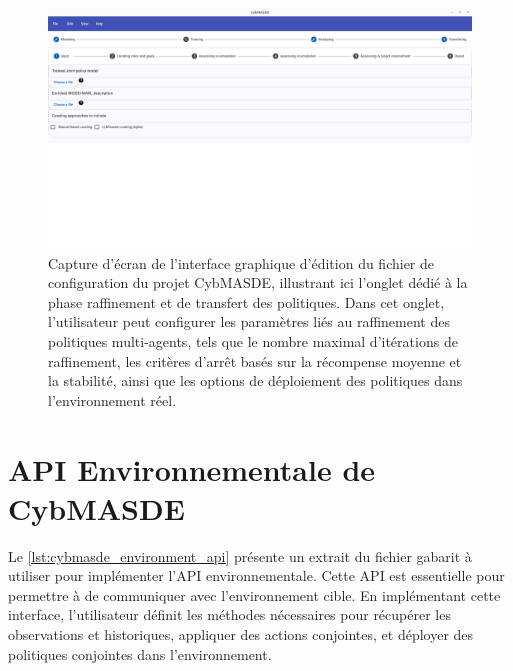 \begin{figure}[h!]
       \centering
       \includegraphics[trim=0cm 15cm 0cm 0cm, clip,width=\linewidth]{figures/refining.png}
       \caption[Capture d'écran de l'onglet raffinement et transfert de l'interface graphique de CybMASDE]{Capture d'écran de l'interface graphique d'édition du fichier de configuration du projet CybMASDE, illustrant ici l'onglet dédié à la phase raffinement et de transfert des politiques. Dans cet onglet, l'utilisateur peut configurer les paramètres liés au raffinement des politiques multi-agents, tels que le nombre maximal d'itérations de raffinement, les critères d'arrêt basés sur la récompense moyenne et la stabilité, ainsi que les options de déploiement des politiques dans l'environnement réel.}
       \label{fig:cybmasde_refining_screenshot}
\end{figure}

\clearpage

\section{API Environnementale de CybMASDE}\label{appendix:cybmasde-environment-api}

Le \autoref{lst:cybmasde_environment_api} présente un extrait du fichier gabarit à utiliser pour implémenter l'API environnementale. Cette API est essentielle pour permettre à  de communiquer avec l'environnement cible. En implémentant cette interface, l'utilisateur définit les méthodes nécessaires pour récupérer les observations et historiques, appliquer des actions conjointes, et déployer des politiques conjointes dans l'environnement.

